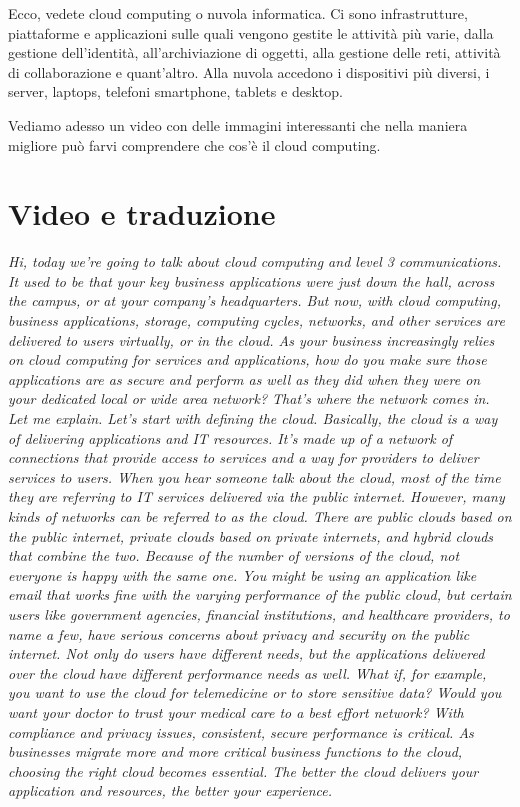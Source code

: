 Ecco, vedete cloud computing o nuvola informatica. Ci sono infrastrutture, piattaforme e applicazioni sulle quali vengono gestite le attività più varie, dalla gestione dell'identità, all'archiviazione di oggetti, alla gestione delle reti, attività di collaborazione e quant'altro. 
Alla nuvola accedono i dispositivi più diversi, i server, laptops, telefoni smartphone, tablets e desktop. 

Vediamo adesso un video con delle immagini interessanti che nella maniera migliore può farvi comprendere che cos'è il cloud computing. 

\section{Video e traduzione}
\textit{Hi, today we're going to talk about cloud computing and level 3 communications. It used to be that your key business applications were just down the hall, across the campus, or at your company's headquarters. But now, with cloud computing, business applications, storage, computing cycles, networks, and other services are delivered to users virtually, or in the cloud. 
As your business increasingly relies on cloud computing for services and applications, how do you make sure those applications are as secure and perform as well as they did when they were on your dedicated local or wide area network? That's where the network comes in. Let me explain. Let's start with defining the cloud. Basically, the cloud is a way of delivering applications and IT resources. It's made up of a network of connections that provide access to services and a way for providers to deliver services to users. When you hear someone talk about the cloud, most of the time they are referring to IT services delivered via the public internet. However, many kinds of networks can be referred to as the cloud. There are public clouds based on the public internet, private clouds based on private internets, and hybrid clouds that combine the two. 
Because of the number of versions of the cloud, not everyone is happy with the same one. You might be using an application like email that works fine with the varying performance of the public cloud, but certain users like government agencies, financial institutions, and healthcare providers, to name a few, have serious concerns about privacy and security on the public internet. Not only do users have different needs, but the applications delivered over the cloud have different performance needs as well. What if, for example, you want to use the cloud for telemedicine or to store sensitive data? Would you want your doctor to trust your medical care to a best effort network? With compliance and privacy issues, consistent, secure performance is critical. As businesses migrate more and more critical business functions to the cloud, choosing the right cloud becomes essential. The better the cloud delivers your application and resources, the better your experience. 
}
